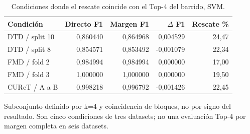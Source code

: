 \begin{table}[!htbp]\centering
\fontsize{9}{11}\selectfont\setlength{\tabcolsep}{4pt}
\caption{Condiciones donde el rescate coincide con el Top-4 del barrido, SVM.}\label{tab:tm-fixed4-margin}
\begin{tabular}{@{}lrrrr@{}}\toprule
Condición & Directo F1 & Margen F1 & $\Delta$ F1 & Rescate \%\\\midrule
DTD / split 10 & 0,860440 & 0,864968 & 0,004529 & 24,47\\
DTD / split 8 & 0,854571 & 0,853492 & -0,001079 & 22,34\\
FMD / fold 2 & 0,984994 & 0,984994 & 0,000000 & 17,00\\
FMD / fold 3 & 1,000000 & 1,000000 & 0,000000 & 19,50\\
CUReT / A a B & 0,998218 & 0,996792 & -0,001426 & 22,45\\
\bottomrule\end{tabular}
\par\smallskip\begin{minipage}{0.98\textwidth}\footnotesize Subconjunto definido por k=4 y coincidencia de bloques, no por signo del resultado. Son cinco condiciones de tres datasets; no una evaluación Top-4 por margen completa en seis datasets.\end{minipage}
\end{table}
